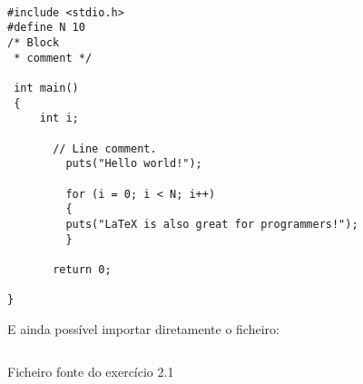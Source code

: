\documentclass[pdftex,12pt,a4paper]{report}
\newenvironment{longlisting}{\captionsetup{type=listing}}{}
\begin{document}
\begin{verbatim}

#include <stdio.h>
#define N 10
/* Block
 * comment */

 int main()
 {
     int i;
	 
	   // Line comment.
		 puts("Hello world!");
			     
		 for (i = 0; i < N; i++)
		 {
		 puts("LaTeX is also great for programmers!");
		 }
										 
	   return 0;
				
}
\end{verbatim}


E ainda possível importar diretamente o ficheiro:


\begin{longlisting}
	\inputminted{c}{Exercicio2/exe2_1.l}
	\caption{Ficheiro fonte do exercício 2.1}
	\label{listing:3}
\end{longlisting}








\end{document}
